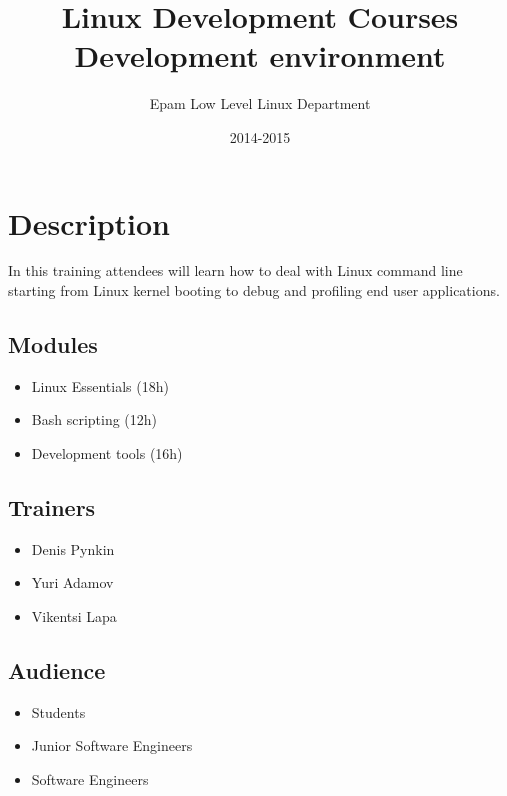 \documentclass[12pt,a4paper,oneside]{article}
\begin{document}
\title{Linux Development Courses\\Development environment}
\author{Epam Low Level Linux Department}
\date{2014-2015}
\maketitle




\tableofcontents
\setcounter{tocdepth}{2}
\newpage

\section{Description}

In this training attendees will learn how to deal with Linux command line
starting from Linux kernel booting to debug and profiling end user applications.

\subsection{Modules}
\begin{itemize}
	\item Linux Essentials (18h)
	\item Bash scripting (12h)
	\item Development tools (16h)
\end{itemize}

\subsection{Trainers}
\begin{itemize}
	\item Denis Pynkin
	\item Yuri Adamov
	\item Vikentsi Lapa
\end{itemize}

\subsection{Audience}
\begin{itemize}
	\item Students
	\item Junior Software Engineers
	\item Software Engineers
\end{itemize}
\end{document}
